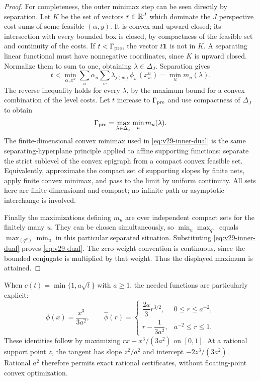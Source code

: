 \begin{proof}
For completeness, the outer minimax step can be seen directly by
separation. Let $K$ be the set of vectors $r\in\mathbb R^J$ which dominate
the $J$ perspective cost sums of some feasible $(\alpha,y)$.
It is convex and upward closed; its intersection with every bounded
box is closed, by compactness of the feasible set and continuity of
the costs. If $t<\Gamma_{\rm pre}$, the vector $t\mathbf1$ is not in
$K$. A separating linear functional must have nonnegative coordinates,
since $K$ is upward closed. Normalize them to sum to one, obtaining
$\lambda\in\Delta_J$. Separation gives
\[
 t<\min_{\alpha,x^u}\sum_u\alpha_u
                         \sum_w\lambda_{j(w)}\phi_w(x^u_w)
       =\min_u m_u(\lambda).
\]
The reverse inequality holds for every $\lambda$, by the maximum
bound for a convex combination of the level costs. Let $t$ increase
to $\Gamma_{\rm pre}$ and use compactness of $\Delta_J$ to obtain
\[
             \Gamma_{\rm pre}=\max_{\lambda\in\Delta_J}
                                             \min_u m_u(\lambda).
\]
The finite-dimensional convex minimax used in
\eqref{eq:v29-inner-dual} is the same separating-hyperplane principle
applied to affine supporting functions: separate the strict sublevel
of the convex epigraph from a compact convex feasible set. Equivalently,
approximate the compact set of supporting slopes by finite nets,
apply finite convex minimax, and pass to the limit by uniform continuity.
All sets here are finite dimensional and compact; no infinite-path or
asymptotic interchange is involved.

Finally the maximizations defining $m_u$ are over independent compact
sets for the finitely many $u$. They can be chosen simultaneously,
so $\min_u\max_{q^u}$ equals $\max_{(q^u)}\min_u$ in this particular
separated situation. Substituting \eqref{eq:v29-inner-dual} proves
\eqref{eq:v29-dual}. The zero-weight convention is continuous, since
the bounded conjugate is multiplied by that weight. Thus the displayed
maximum is attained.
\end{proof}

When $c(t)=\min\{1,a\sqrt t\}$ with $a\ge1$, the needed functions
are particularly explicit:
\begin{equation}\label{eq:v29-cubic-dual}
 \phi(x)=\frac{x^3}{3a^2},\qquad
 \widehat\phi(r)=
 \begin{cases}
  \dfrac{2a}{3}r^{3/2},&0\le r\le a^{-2},\\[3pt]
  r-\dfrac1{3a^2},&a^{-2}\le r\le1.
 \end{cases}
\end{equation}
These identities follow by maximizing $rx-x^3/(3a^2)$ on $[0,1]$.
At a rational support point $z$, the tangent has slope $z^2/a^2$ and
intercept $-2z^3/(3a^2)$. Rational $a^2$ therefore permits exact
rational certificates, without floating-point convex optimization.

